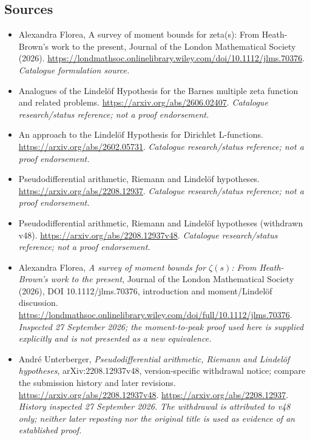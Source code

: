 \documentclass[11pt,a4paper]{article}
\numberwithin{equation}{section}
\begin{document}
\subsection{Sources}
\begin{itemize}\raggedright
\item[\textnormal{[S1]}]\hypertarget{source:statement:1}{} Alexandra Florea, A survey of moment bounds for zeta(s): From Heath-Brown's work to the present, Journal of the London Mathematical Society (2026).
\url{https://londmathsoc.onlinelibrary.wiley.com/doi/10.1112/jlms.70376}.
{\small\textit{Catalogue formulation source.}}
\item[\textnormal{[S2]}]\hypertarget{source:statement:2}{} Analogues of the Lindelöf Hypothesis for the Barnes multiple zeta function and related problems.
\url{https://arxiv.org/abs/2606.02407}.
{\small\textit{Catalogue research/status reference; not a proof endorsement.}}
\item[\textnormal{[S3]}]\hypertarget{source:statement:3}{} An approach to the Lindelöf Hypothesis for Dirichlet L-functions.
\url{https://arxiv.org/abs/2602.05731}.
{\small\textit{Catalogue research/status reference; not a proof endorsement.}}
\item[\textnormal{[S4]}]\hypertarget{source:statement:4}{} Pseudodifferential arithmetic, Riemann and Lindelöf hypotheses.
\url{https://arxiv.org/abs/2208.12937}.
{\small\textit{Catalogue research/status reference; not a proof endorsement.}}
\item[\textnormal{[S5]}]\hypertarget{source:statement:5}{} Pseudodifferential arithmetic, Riemann and Lindelöf hypotheses (withdrawn v48).
\url{https://arxiv.org/abs/2208.12937v48}.
{\small\textit{Catalogue research/status reference; not a proof endorsement.}}
\item[\textnormal{[E1]}]\hypertarget{extra:statement:1}{} Alexandra Florea,
\emph{A survey of moment bounds for $\zeta(s)$: From Heath-Brown's work to
the present}, Journal of the London Mathematical Society (2026),
DOI 10.1112/jlms.70376, introduction and moment/Lindel\"of discussion.
\url{https://londmathsoc.onlinelibrary.wiley.com/doi/full/10.1112/jlms.70376}.
{\small\textit{Inspected 27 September 2026; the moment-to-peak proof used
here is supplied explicitly and is not presented as a new equivalence.}}
\item[\textnormal{[E2]}]\hypertarget{extra:statement:2}{} Andr\'e Unterberger,
\emph{Pseudodifferential arithmetic, Riemann and Lindel\"of hypotheses},
arXiv:2208.12937v48, version-specific withdrawal notice; compare the
submission history and later revisions.
\url{https://arxiv.org/abs/2208.12937v48}.
\url{https://arxiv.org/abs/2208.12937}.
{\small\textit{History inspected 27 September 2026. The withdrawal is
attributed to v48 only; neither later reposting nor the original title is
used as evidence of an established proof.}}
\end{itemize}
\end{document}
